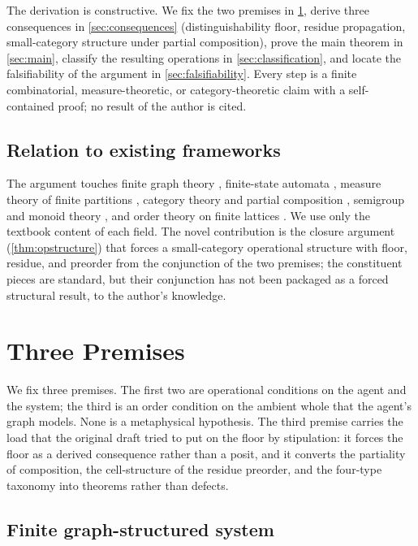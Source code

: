 \documentclass[11pt,twocolumn,a4paper]{article}
\theoremstyle{thmstyle}
\theoremstyle{definition}
\theoremstyle{remark}
\begin{document}
The derivation is constructive. We fix the two premises in
\cref{sec:premises}, derive three consequences in
\cref{sec:consequences} (distinguishability floor, residue
propagation, small-category structure under partial composition),
prove the main theorem in \cref{sec:main}, classify the resulting
operations in \cref{sec:classification}, and locate the
falsifiability of the argument in \cref{sec:falsifiability}. Every
step is a finite combinatorial, measure-theoretic, or
category-theoretic claim with a self-contained proof; no result of
the author is cited.

\subsection{Relation to existing frameworks}

The argument touches finite graph theory \citep{diestel2017,
bollobas1998}, finite-state automata \citep{hopcroft2007}, measure
theory of finite partitions \citep{halmos1950}, category theory and
partial composition \citep{maclane1998}, semigroup and monoid theory
\citep{howie1995}, and order theory on finite lattices
\citep{daveypriestley2002}. We use only the textbook content of
each field. The novel contribution is the closure argument
(\cref{thm:opstructure}) that forces a small-category operational
structure with floor, residue, and preorder from the conjunction of
the two premises; the constituent pieces are standard, but their
conjunction has not been packaged as a forced structural result, to
the author's knowledge.

\section{Three Premises}
\label{sec:premises}

We fix three premises. The first two are operational conditions on
the agent and the system; the third is an order condition on the
ambient whole that the agent's graph models. None is a metaphysical
hypothesis. The third premise carries the load that the original
draft tried to put on the floor by stipulation: it forces the floor
as a derived consequence rather than a posit, and it converts the
partiality of composition, the cell-structure of the residue
preorder, and the four-type taxonomy into theorems rather than
defects.

\subsection{Finite graph-structured system}
\end{document}
